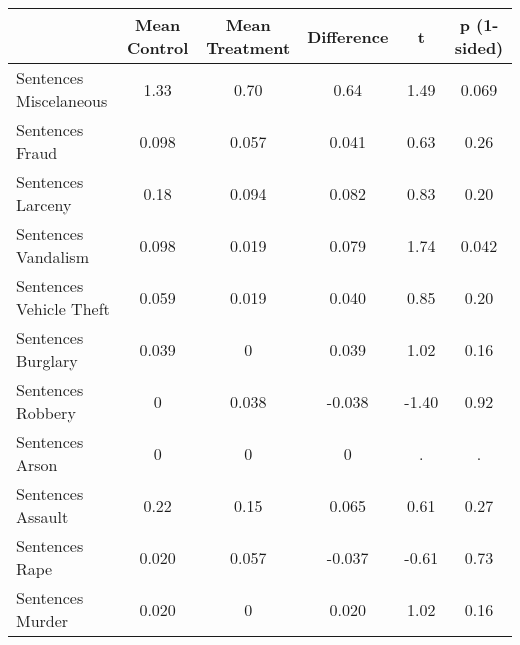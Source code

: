 {
\def\sym#1{\ifmmode^{#1}\else\(^{#1}\)\fi}
\begin{tabular}{l*{1}{ccccc}}
\hline\hline
                    &Mean Control&Mean Treatment&  Difference&           t& p (1-sided)\\
\hline
Sentences Miscelaneous &        1.33&        0.70&        0.64&        1.49&       0.069\\
Sentences Fraud     &       0.098&       0.057&       0.041&        0.63&        0.26\\
Sentences Larceny   &        0.18&       0.094&       0.082&        0.83&        0.20\\
Sentences Vandalism &       0.098&       0.019&       0.079&        1.74&       0.042\\
Sentences Vehicle Theft &       0.059&       0.019&       0.040&        0.85&        0.20\\
Sentences Burglary  &       0.039&           0&       0.039&        1.02&        0.16\\
Sentences Robbery   &           0&       0.038&      -0.038&       -1.40&        0.92\\
Sentences Arson     &           0&           0&           0&           .&           .\\
Sentences Assault   &        0.22&        0.15&       0.065&        0.61&        0.27\\
Sentences Rape      &       0.020&       0.057&      -0.037&       -0.61&        0.73\\
Sentences Murder    &       0.020&           0&       0.020&        1.02&        0.16\\
\hline\hline
\end{tabular}
}
